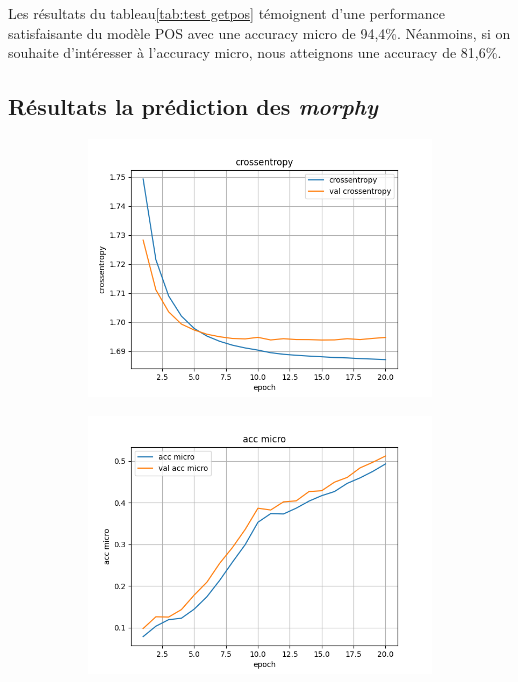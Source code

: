 \documentclass[a4paper]{article}
\begin{document}
Les résultats du tableau\ref{tab:test getpos} témoignent d'une performance satisfaisante du modèle POS avec une accuracy micro de 94,4\%. Néanmoins, si on souhaite d'intéresser à l'accuracy micro, nous atteignons une accuracy de 81,6\%.

\subsection{Résultats la prédiction des \textit{morphy}}

\begin{figure}[H]
    \centering
    \begin{subfigure}{0.32\textwidth}
        \centering
        \includegraphics[width=\linewidth]{../logs/supertag/crossentropy.png}
    \end{subfigure}
    \begin{subfigure}{0.32\textwidth}
        \centering
        \includegraphics[width=\linewidth]{../logs/supertag/acc micro.png}

\end{subfigure}
\end{figure}
\end{document}
